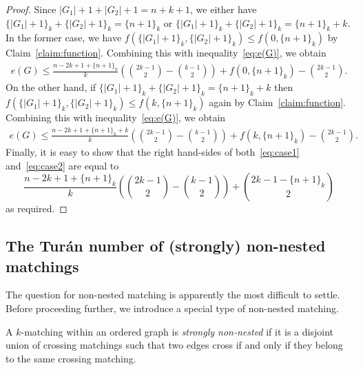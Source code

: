 \documentclass[11pt]{article}
\theoremstyle{definition}
\begin{document}
\begin{proof}
    Since $|G_1|+1+|G_2|+1=n+k+1$, we either have $\{|G_1|+1\}_k+\{|G_2|+1\}_k=\{n+1\}_k$ or $\{|G_1|+1\}_k+\{|G_2|+1\}_k=\{n+1\}_k+k$.
    In the former case, we have $f(\{|G_1|+1\}_k,\{|G_2|+1\}_k)\le f(0,\{n+1\}_k)$ by Claim~\ref{claim:function}.
    Combining this with inequality~\eqref{eq:e(G)}, we obtain
    \begin{align}\label{eq:case1}
    e(G)\le\frac{n-2k+1+\{n+1\}_k}{k}\left(\binom{2k-1}{2}-\binom{k-1}{2}\right)+f(0,\{n+1\}_k)-\binom{2k-1}{2}.
    \end{align}
    On the other hand, if $\{|G_1|+1\}_k+\{|G_2|+1\}_k=\{n+1\}_k+k$ then $f(\{|G_1|+1\}_k,\{|G_2|+1\}_k)\le f(k,\{n+1\}_k)$ again by Claim~\ref{claim:function}.
    Combining this with inequality~\eqref{eq:e(G)}, we obtain
    \begin{align}\label{eq:case2}
    e(G)\le\frac{n-2k+1+\{n+1\}_k+k}{k}\left(\binom{2k-1}{2}-\binom{k-1}{2}\right)+f(k,\{n+1\}_k)-\binom{2k-1}{2}.
    \end{align}
    Finally, it is easy to show that the right hand-sides of both~\eqref{eq:case1} and~\eqref{eq:case2} are equal to
    $$\frac{n-2k+1+\{n+1\}_k}{k}\left(\binom{2k-1}{2}-\binom{k-1}{2}\right)+\binom{2k-1-\{n+1\}_k}{2}$$ 
    as required.

\end{proof}


\subsection{The Tur\'an number of (strongly) non-nested matchings}

The question for non-nested matching is apparently the most difficult to settle.
Before proceeding further, we introduce a special type of non-nested matching.

A $k$-matching within an ordered graph is {\it strongly non-nested} if it is a disjoint union of crossing matchings such that two edges cross if and only if they belong to the same crossing matching. 
\end{document}
